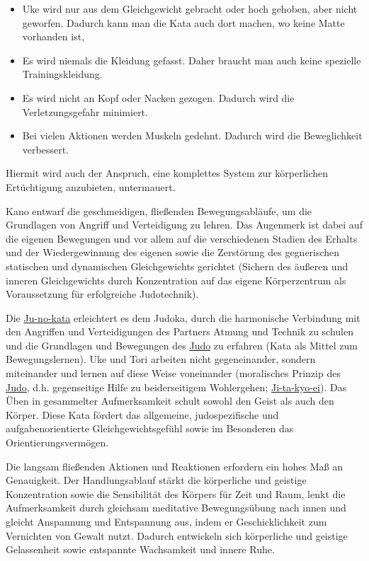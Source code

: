 \documentclass[justified, a4paper, notitlepage, captions=tableheading, nobib]{tufte-handout}
\begin{document}
\begin{itemize}
\item Uke wird nur aus dem Gleichgewicht gebracht oder hoch gehoben, aber nicht geworfen. Dadurch kann man die Kata auch dort machen, wo keine Matte vorhanden ist,
\item Es wird niemals die Kleidung gefasst. Daher braucht man auch keine spezielle Trainingskleidung.
\item Es wird nicht an Kopf oder Nacken gezogen. Dadurch wird die Verletzungsgefahr minimiert.
\item Bei vielen Aktionen werden Muskeln gedehnt. Dadurch wird die Beweglichkeit verbessert.
\end{itemize}

Hiermit wird auch der Anspruch, eine komplettes System zur körperlichen Ertüchtigung anzubieten, untermauert.

Kano entwarf die geschmeidigen, fließenden Bewegungsabläufe, um die Grundlagen von Angriff und Verteidigung zu lehren. Das Augenmerk ist dabei auf die eigenen Bewegungen und vor allem auf die verschiedenen Stadien des Erhalts und der Wiedergewinnung des eigenen sowie die Zerstörung des gegnerischen statischen und dynamischen Gleichgewichts gerichtet (Sichern des äußeren und inneren Gleichgewichts durch Konzentration auf das eigene Körperzentrum als Voraussetzung für erfolgreiche Judotechnik).

Die \hyperref[orgd6be93b]{Ju-no-kata} erleichtert es dem Judoka, durch die harmonische Verbindung mit den Angriffen und Verteidigungen des Partners Atmung und Technik zu schulen und die Grundlagen und Bewegungen des \hyperref[org60aba15]{Judo} zu erfahren (Kata als Mittel zum Bewegungslernen). Uke und Tori arbeiten nicht gegeneinander, sondern miteinander und lernen auf diese Weise voneinander (moralisches Prinzip des \hyperref[org60aba15]{Judo}, d.h. gegenseitige Hilfe zu beiderseitigem Wohlergehen; \hyperref[org2566ca3]{Ji-ta-kyo-ei}). Das Üben in gesammelter Aufmerksamkeit schult sowohl den Geist als auch den Körper. Diese Kata fördert das allgemeine, judospezifische und aufgabenorientierte Gleichgewichtsgefühl sowie im Besonderen das Orientierungsvermögen.

Die langsam fließenden Aktionen und Reaktionen erfordern ein hohes Maß an Genauigkeit. Der Handlungsablauf stärkt die körperliche und geistige Konzentration sowie die Sensibilität des Körpers für Zeit und Raum, lenkt die Aufmerksamkeit durch gleichsam meditative Bewegungsübung nach innen und gleicht Anspannung und Entspannung aus, indem er Geschicklichkeit zum Vernichten von Gewalt nutzt.
Dadurch entwickeln sich körperliche und geistige Gelassenheit sowie entspannte Wachsamkeit und innere Ruhe.
\end{document}
